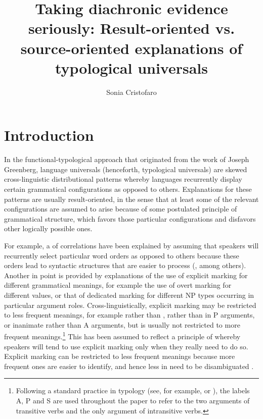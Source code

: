 \documentclass[output=paper]{langsci/langscibook}
\author{Sonia Cristofaro\affiliation{University of Pavia}}
\title{Taking diachronic evidence seriously: Result-oriented
  vs. source-oriented explanations of typological universals}
\begin{document}
\maketitle 
  
\label{p:cristofaro:evidenceseriously}
 

\section{Introduction}\label{intro}
In the functional-typological approach that originated from the work
of Joseph Greenberg, language universals (henceforth, typological
universals) are skewed cross-linguistic distributional patterns whereby languages recurrently display certain grammatical configurations as opposed to others. Explanations for these patterns are usually result-oriented, in the sense  that at least some of the relevant configurations are assumed to arise because of some postulated principle of grammatical structure, which favors those particular configurations and disfavors other logically possible ones.

For example, a  of  correlations have been explained by assuming that speakers will recurrently select particular word orders as opposed to others because these orders lead to syntactic structures that are easier to process (\citealt{Hawkins2004},  among others). Another  in point is provided by explanations of the use of explicit marking for different grammatical meanings, for example the use of overt marking for different  values, or that of dedicated  marking for different NP types occurring in particular argument roles. Cross-linguistically, explicit marking may be restricted to less frequent meanings, for example  rather than ,  rather than
in P arguments, or inanimate rather than  A arguments, but
is usually not restricted to more frequent meanings.\footnote{Following a standard
    practice in typology (see, for example, \citealt{Comrie2} or \citealt{Dixon1994}), the labels A, P and S are used throughout
    the paper to refer to the two arguments of transitive verbs and
    the only argument of intransitive verbs.} This has been assumed to reflect a principle of  whereby speakers will tend to use explicit marking only when they really need to do so. Explicit marking can be restricted to less frequent meanings because more frequent ones are easier to identify, and hence less in need to be disambiguated
\citep{Greenberg1966,Corbett2000,TU2,Martinmarkedness,Haspelmath2008}. 
\end{document}
